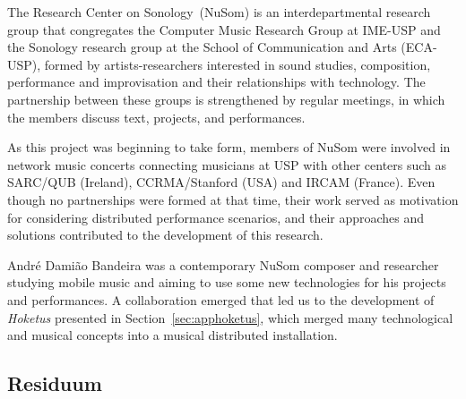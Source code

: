 The Research Center on Sonology~(NuSom) is an interdepartmental research group that congregates the Computer Music Research Group at IME-USP and the Sonology research group at the School of Communication and Arts (ECA-USP), formed by artists-researchers interested in sound studies, composition,  performance and improvisation and their relationships with technology.
The partnership between these groups is strengthened by regular meetings, in which the members discuss text, projects, and performances.

As this project was beginning to take form, members of NuSom were involved in network music concerts connecting musicians at USP with other centers such as SARC/QUB (Ireland), CCRMA/Stanford (USA) and IRCAM (France).
Even though no partnerships were formed at that time, their work served as motivation for considering distributed performance scenarios, and their approaches and solutions contributed to the development of this research.

André Damião Bandeira was a contemporary NuSom composer and researcher studying mobile music and aiming to use some new technologies for his projects and performances.
A collaboration emerged that led us to the development of \textit{Hoketus} presented in Section~\ref{sec:apphoketus}, which merged many technological and musical concepts into a musical distributed installation.



\subsection*{Residuum}

